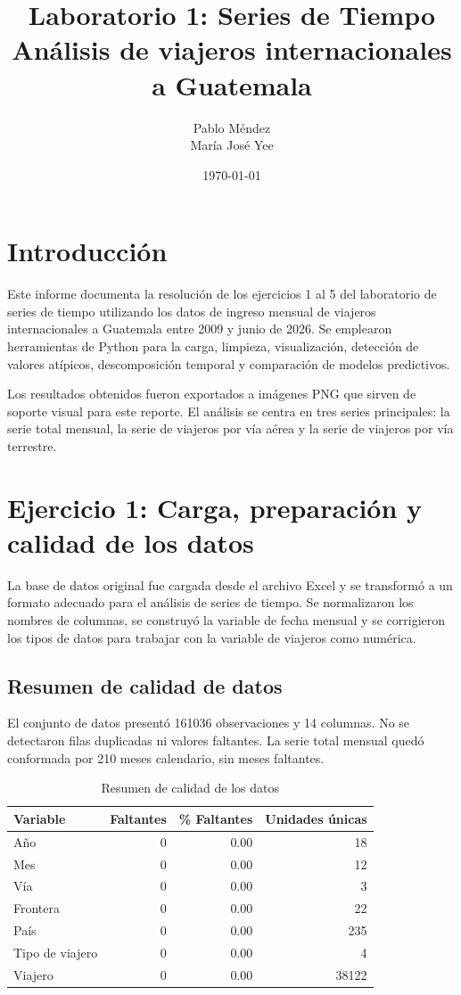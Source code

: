\documentclass[11pt]{article}
\title{Laboratorio 1: Series de Tiempo\\Análisis de viajeros internacionales a Guatemala}
\author{Pablo Méndez \\ María José Yee}
\date{\today}
\begin{document}
\maketitle
\tableofcontents
\newpage

\section{Introducción}

Este informe documenta la resolución de los ejercicios 1 al 5 del laboratorio de series de tiempo utilizando los datos de ingreso mensual de viajeros internacionales a Guatemala entre 2009 y junio de 2026. Se emplearon herramientas de Python para la carga, limpieza, visualización, detección de valores atípicos, descomposición temporal y comparación de modelos predictivos.

Los resultados obtenidos fueron exportados a imágenes PNG que sirven de soporte visual para este reporte. El análisis se centra en tres series principales: la serie total mensual, la serie de viajeros por vía aérea y la serie de viajeros por vía terrestre.

\section{Ejercicio 1: Carga, preparación y calidad de los datos}

La base de datos original fue cargada desde el archivo Excel y se transformó a un formato adecuado para el análisis de series de tiempo. Se normalizaron los nombres de columnas, se construyó la variable de fecha mensual y se corrigieron los tipos de datos para trabajar con la variable de viajeros como numérica.

\subsection{Resumen de calidad de datos}

El conjunto de datos presentó 161036 observaciones y 14 columnas. No se detectaron filas duplicadas ni valores faltantes. La serie total mensual quedó conformada por 210 meses calendario, sin meses faltantes.

\begin{table}[H]
\centering
\caption{Resumen de calidad de los datos}
\begin{tabular}{lrrr}
\toprule
Variable & Faltantes & \% Faltantes & Unidades únicas \\
\midrule
Año & 0 & 0.00 & 18 \\
Mes & 0 & 0.00 & 12 \\
Vía & 0 & 0.00 & 3 \\
Frontera & 0 & 0.00 & 22 \\
País & 0 & 0.00 & 235 \\
Tipo de viajero & 0 & 0.00 & 4 \\
Viajero & 0 & 0.00 & 38122 \\
\bottomrule
\end{tabular}
\end{table}
\end{document}
